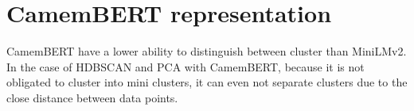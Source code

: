 \section{CamemBERT representation}

CamemBERT have a lower ability to distinguish between cluster than MiniLMv2. In the case of HDBSCAN and PCA with CamemBERT, because it is not obligated to cluster into mini clusters, it can even not separate clusters due to the close distance between data points.


